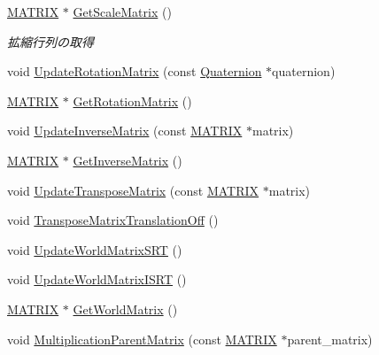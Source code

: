 \begin{DoxyCompactItemize}
\mbox{\hyperlink{_vector3_d_8h_a032295cd9fb1b711757c90667278e744}{M\+A\+T\+R\+IX}} $\ast$ \mbox{\hyperlink{class_matrix_extend_a13d6cb82385873959bde75fb64235943}{Get\+Scale\+Matrix}} ()
\begin{DoxyCompactList}\small\item\em 拡縮行列の取得 \end{DoxyCompactList}\item 
void \mbox{\hyperlink{class_matrix_extend_afa307701c3147fc345ed10dee054affb}{Update\+Rotation\+Matrix}} (const \mbox{\hyperlink{_vector3_d_8h_a3ee38c9c46d9851e33a9a1113328dafc}{Quaternion}} $\ast$quaternion)
\item 
\mbox{\hyperlink{_vector3_d_8h_a032295cd9fb1b711757c90667278e744}{M\+A\+T\+R\+IX}} $\ast$ \mbox{\hyperlink{class_matrix_extend_a6e10c2692b92f15ea4a1a69fc22c66c4}{Get\+Rotation\+Matrix}} ()
\item 
void \mbox{\hyperlink{class_matrix_extend_a5aa7bce55ed92acb79d21fda51e83146}{Update\+Inverse\+Matrix}} (const \mbox{\hyperlink{_vector3_d_8h_a032295cd9fb1b711757c90667278e744}{M\+A\+T\+R\+IX}} $\ast$matrix)
\item 
\mbox{\hyperlink{_vector3_d_8h_a032295cd9fb1b711757c90667278e744}{M\+A\+T\+R\+IX}} $\ast$ \mbox{\hyperlink{class_matrix_extend_aedfee5eb2eb7df8cac4b17045233748a}{Get\+Inverse\+Matrix}} ()
\item 
void \mbox{\hyperlink{class_matrix_extend_a81e92fe4305ff9569809b61e2e92df31}{Update\+Transpose\+Matrix}} (const \mbox{\hyperlink{_vector3_d_8h_a032295cd9fb1b711757c90667278e744}{M\+A\+T\+R\+IX}} $\ast$matrix)
\item 
void \mbox{\hyperlink{class_matrix_extend_ae567bb2d140dff892ed1b63f8de33ba9}{Transpose\+Matrix\+Translation\+Off}} ()
\item 
void \mbox{\hyperlink{class_matrix_extend_a4c92a6d037b00bc2514064e00323c5dd}{Update\+World\+Matrix\+S\+RT}} ()
\item 
void \mbox{\hyperlink{class_matrix_extend_ab0aaf14f8621fde91f9db5537a4187e6}{Update\+World\+Matrix\+I\+S\+RT}} ()
\item 
\mbox{\hyperlink{_vector3_d_8h_a032295cd9fb1b711757c90667278e744}{M\+A\+T\+R\+IX}} $\ast$ \mbox{\hyperlink{class_matrix_extend_a1a88845d1b9da14c33c91fa8da2e3a15}{Get\+World\+Matrix}} ()
\item 
void \mbox{\hyperlink{class_matrix_extend_a1847728feb977bd7ccdf1987953fe203}{Multiplication\+Parent\+Matrix}} (const \mbox{\hyperlink{_vector3_d_8h_a032295cd9fb1b711757c90667278e744}{M\+A\+T\+R\+IX}} $\ast$parent\+\_\+matrix)
\end{DoxyCompactItemize}


